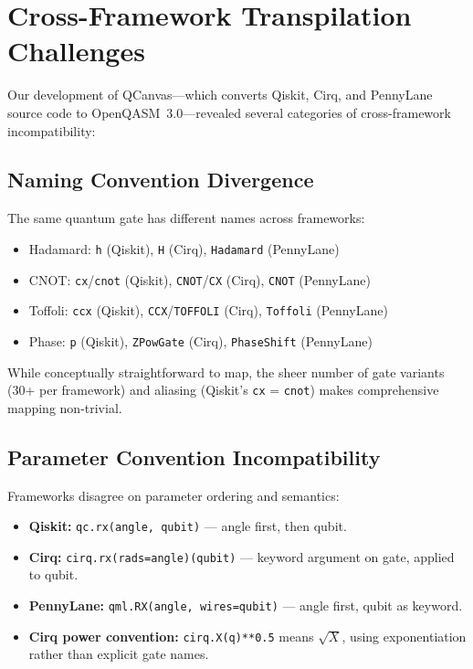\documentclass[journal]{IEEEtran}
\begin{document}
\section{Cross-Framework Transpilation Challenges}
\label{sec:challenges}

Our development of QCanvas---which converts Qiskit, Cirq, and PennyLane source code to OpenQASM~3.0---revealed several categories of cross-framework incompatibility:

\subsection{Naming Convention Divergence}

The same quantum gate has different names across frameworks:
\begin{itemize}
    \item Hadamard: \texttt{h} (Qiskit), \texttt{H} (Cirq), \texttt{Hadamard} (PennyLane)
    \item CNOT: \texttt{cx}/\texttt{cnot} (Qiskit), \texttt{CNOT}/\texttt{CX} (Cirq), \texttt{CNOT} (PennyLane)
    \item Toffoli: \texttt{ccx} (Qiskit), \texttt{CCX}/\texttt{TOFFOLI} (Cirq), \texttt{Toffoli} (PennyLane)
    \item Phase: \texttt{p} (Qiskit), \texttt{ZPowGate} (Cirq), \texttt{PhaseShift} (PennyLane)
\end{itemize}

While conceptually straightforward to map, the sheer number of gate variants (30+ per framework) and aliasing (Qiskit's \texttt{cx} = \texttt{cnot}) makes comprehensive mapping non-trivial.

\subsection{Parameter Convention Incompatibility}

Frameworks disagree on parameter ordering and semantics:
\begin{itemize}
    \item \textbf{Qiskit:} \texttt{qc.rx(angle, qubit)} --- angle first, then qubit.
    \item \textbf{Cirq:} \texttt{cirq.rx(rads=angle)(qubit)} --- keyword argument on gate, applied to qubit.
    \item \textbf{PennyLane:} \texttt{qml.RX(angle, wires=qubit)} --- angle first, qubit as keyword.
    \item \textbf{Cirq power convention:} \texttt{cirq.X(q)**0.5} means $\sqrt{X}$, using exponentiation rather than explicit gate names.
\end{itemize}
\end{document}
